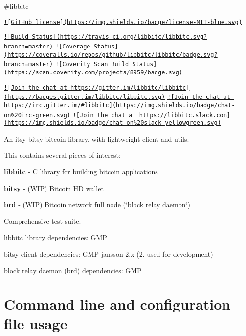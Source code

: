 \#libbitc

\href{https://raw.githubusercontent.com/libbitc/libbitc/master/COPYING}{\tt !\mbox{[}Git\-Hub license\mbox{]}(https\-://img.\-shields.\-io/badge/license-\/\-M\-I\-T-\/blue.\-svg)}

\href{https://travis-ci.org/libbitc/libbitc}{\tt !\mbox{[}Build Status\mbox{]}(https\-://travis-\/ci.\-org/libbitc/libbitc.\-svg?branch=master)} \href{https://coveralls.io/github/libbitc/libbitc?branch=master}{\tt !\mbox{[}Coverage Status\mbox{]}(https\-://coveralls.\-io/repos/github/libbitc/libbitc/badge.\-svg?branch=master)} \href{https://scan.coverity.com/projects/libbitc-libbitc}{\tt !\mbox{[}Coverity Scan Build Status\mbox{]}(https\-://scan.\-coverity.\-com/projects/8959/badge.\-svg)}

\href{https://gitter.im/libbitc/libbitc?utm_source=badge&utm_medium=badge&utm_campaign=pr-badge&utm_content=badge}{\tt !\mbox{[}Join the chat at https\-://gitter.\-im/libbitc/libbitc\mbox{]}(https\-://badges.\-gitter.\-im/libbitc/libbitc.\-svg)} \href{https://irc.gitter.im/}{\tt !\mbox{[}Join the chat at https\-://irc.\-gitter.\-im/\#libbitc\mbox{]}(https\-://img.\-shields.\-io/badge/chat-\/on\%20irc-\/green.\-svg)} \href{https://libbitc.slack.com}{\tt !\mbox{[}Join the chat at https\-://libbitc.\-slack.\-com\mbox{]}(https\-://img.\-shields.\-io/badge/chat-\/on\%20slack-\/yellowgreen.\-svg)}

An itsy-\/bitsy bitcoin library, with lightweight client and utils.

This contains several pieces of interest\-:
\begin{DoxyItemize}
\item {\bfseries libbitc} -\/ C library for building bitcoin applications
\item {\bfseries bitsy} -\/ (W\-I\-P) Bitcoin H\-D wallet
\item {\bfseries brd} -\/ (W\-I\-P) Bitcoin network full node (\char`\"{}block relay daemon\char`\"{})
\item Comprehensive test suite.
\end{DoxyItemize}

libbitc library dependencies\-: G\-M\-P

bitsy client dependencies\-: G\-M\-P jansson 2.\-x (2. used for development)

block relay daemon (brd) dependencies\-: G\-M\-P

\section*{Command line and configuration file usage }

